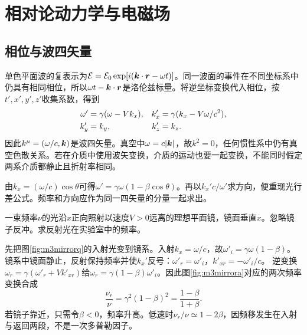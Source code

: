 \chapter{相对论动力学与电磁场}
\section{相位与波四矢量}\label{th:m3wave}
单色平面波的复表示为$\mathcal E=\mathcal E_0\exp[i(\bm{k}\cdot\bm{r}-\omega t)]$。同一波面的事件在不同坐标系中仍具有相同相位，所以$\omega t-\bm{k}\cdot\bm{r}$是洛伦兹标量。将逆坐标变换代入相位，按$t',x',y',z'$收集系数，得到
\begin{align}\label{eq:m3wave}
 \omega'&=\gamma(\omega-Vk_x),& k_x'&=\gamma(k_x-V\omega/c^2),\\
 k_y'&=k_y,&k_z'&=k_z.\notag
\end{align}
因此$k^\mu=(\omega/c,\bm{k})$是波四矢量。真空中$\omega=c|\bm{k}|$，故$k^2=0$，任何惯性系中仍有真空色散关系。若在介质中使用波矢变换，介质的运动也要一起变换，不能同时假定两系介质都静止且折射率相同。

由$k_x=(\omega/c)\cos\theta$可得$\omega'=\gamma\omega(1-\beta\cos\theta)$。再以$k_x'c/\omega'$求方向，便重现光行差公式。频率和方向应作为同一四矢量的分量一起求出。

\begin{example}\label{ex:m3movingmirror}
一束频率$\nu$的光沿$x$正向照射以速度$V>0$远离的理想平面镜，镜面垂直$x$。忽略镜子反冲。求反射光在实验室中的频率。
\end{example}
\begin{solution}
先把图\ref{fig:m3mirrorq}的入射光变到镜系。入射$k_x=\omega/c$，故$\omega'_i=\gamma\omega(1-\beta)$。镜系中镜面静止，反射保持频率并使$k_x'$反号：$\omega'_r=\omega'_i$，$k'_{xr}=-\omega'_i/c$。
逆变换$\omega_r=\gamma(\omega'_r+Vk'_{xr})$给$\omega_r=\gamma(1-\beta)\omega'_i$。因此图\ref{fig:m3mirrora}对应的两次频率变换合成
\[
 \frac{\nu_r}\nu=\gamma^2(1-\beta)^2=\frac{1-\beta}{1+\beta}.
\]
若镜子靠近，只需令$\beta<0$，频率升高。低速时$\nu_r/\nu\simeq1-2\beta$，因频移发生在入射与返回两段，不是一次多普勒因子。
\end{solution}

